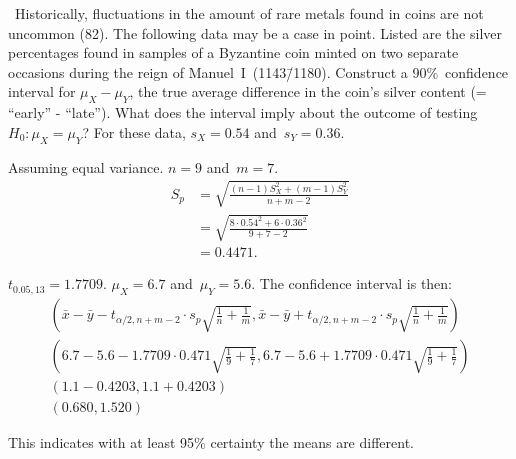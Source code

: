 \begin{problem}
  ~Historically, fluctuations in the amount of rare metals found in coins are not uncommon (82). The following data may be a case in point. Listed are the silver percentages found in samples of a Byzantine coin minted on two separate occasions during the reign of Manuel~I~(1143\=/1180). Construct a 90\%~confidence interval for ${\mu_{X} - \mu_{Y}}$, the true average difference in the coin’s silver content (= ``early'' - ``late''). What does the interval imply about the outcome of testing ${H_0: \mu_{X} = \mu_{Y}}$? For these data, ${s_{X} = 0.54}$ and~${s_{Y} = 0.36}$.
\end{problem}

\noindent
Assuming equal variance. ${n = 9}$ and~${m = 7}$.
\begin{align}
  S_{p} &= \sqrt{\frac{(n-1)S^{2}_{X} + (m-1)S^{2}_{Y}}{n + m - 2}} \\
        &= \sqrt{\frac{8 \cdot 0.54^2 + 6 \cdot 0.36^2}{9 + 7 - 2}} \\
        &= 0.4471\text{.}
\end{align}

\noindent
${t_{0.05,13} = 1.7709}$.  ${\mu_{X} = 6.7}$ and~${\mu_{Y} = 5.6}$. The confidence interval is then:
\begin{align}
  \left(\bar{x} - \bar{y} - t_{\alpha/2,n+m-2} \cdot s_p\sqrt{\frac{1}{n} + \frac{1}{m}},\bar{x} - \bar{y} + t_{\alpha/2,n+m-2} \cdot s_p\sqrt{\frac{1}{n} + \frac{1}{m}}\right) \\
  \left(6.7 - 5.6 - 1.7709 \cdot 0.471 \sqrt{\frac{1}{9} + \frac{1}{7}}, 6.7 - 5.6+ 1.7709 \cdot 0.471 \sqrt{\frac{1}{9} + \frac{1}{7}}\right) \\
  \left(1.1 - 0.4203, 1.1 + 0.4203\right) \\
  \left(0.680, 1.520\right)
\end{align}

This indicates with at least 95\% certainty the means are different.
